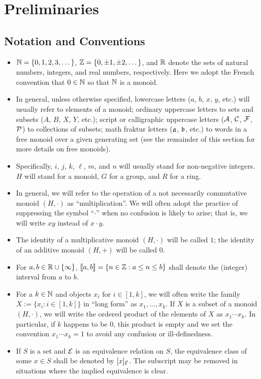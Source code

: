 \section{Preliminaries}
\subsection{Notation and Conventions} \label{subsec:generalities}

\begin{itemize}
	\item $\NN = \{0,1,2,3,\dots\}$, $\ZZ = \{0,\pm 1, \pm 2,\dots\}$, and $\RR$ denote the sets of natural numbers, integers, and real numbers, respectively.
	Here we adopt the French convention that $0\in \NN$ so that $\NN$ is a monoid.
	\item In general, unless otherwise specified, lowercase letters ($a$, $b$, $x$, $y$, etc.) will usually refer to elements of a monoid; ordinary uppercase letters to sets and subsets ($A$, $B$, $X$, $Y$, etc.); script or calligraphic uppercase letters ($\A$, $\C$, $\F$, $\P$) to collections of subsets; math fraktur letters ($\aa$, $\bb$, etc.) to words in a free monoid over a given generating set (see the remainder of this section for more details on free monoids).
	\item Specifically, $i$, $j$, $k$, $\ell$, $m$, and $n$ will usually stand for non-negative integers. 
	$H$ will stand for a monoid, $G$ for a group, and $R$ for a ring.
	\item In general, we will refer to the operation of a not necessarily commutative monoid $(H,\cdot)$ as ``multiplication''.
	We will often adopt the practice of suppressing the symbol ``$\cdot$'' when no confusion is likely to arise; that is, we will write $xy$ instead of $x\cdot y$.
	\item The identity of a multiplicative monoid $(H,\cdot)$ will be called $1$; the identity of an additive monoid $(H,+)$ will be called $0$.
	\item For $a, b\in \RR\cup\{\infty\}$, $\llb a,b \rrb = \{ n\in \ZZ : a \le n \le b \}$ shall denote the (integer) interval from $a$ to $b$.
	\item For a $k\in \NN$ and objects $x_i$ for $i\in [1,k]$, we will often write the family $X:=\{x_i: i\in [1,k]\}$ in ``long form'' as $x_1,\dots,x_k$.
	If $X$ is a subset of a monoid $(H,\cdot)$, we will write the ordered product of the elements of $X$ as $x_1\cdots x_k$.
	In particular, if $k$ happens to be $0$, this product is empty and we set the convention $x_1\cdots x_k = 1$ to avoid any confusion or ill-definedness.
	\item If $S$ is a set and $\E$ is an equivalence relation on $S$, the equivalence class of some $x\in S$ shall be denoted by $[x]_\E$.
	The subscript may be removed in situations where the implied equivalence is clear.
\end{itemize}

